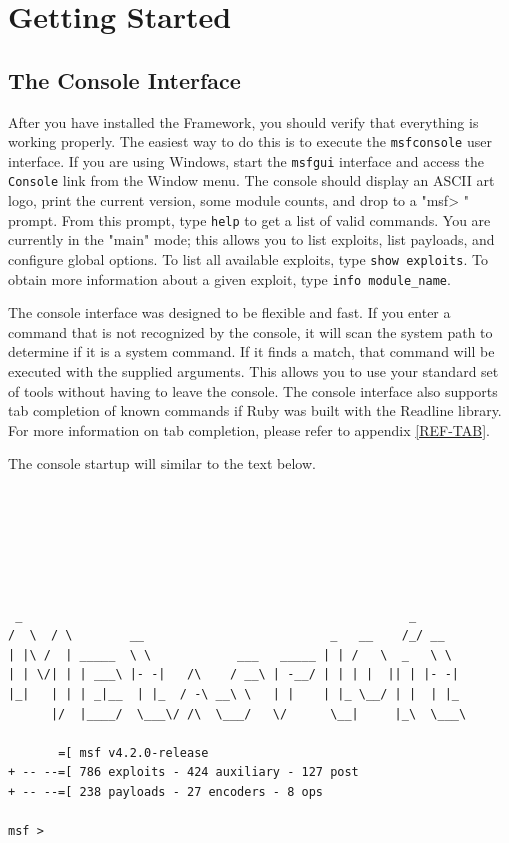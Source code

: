 \documentclass{report}
\begin{document}
\pagebreak

\chapter{Getting Started}

    \section{The Console Interface}
    \label{STARTED-CONSOLE}

\par
After you have installed the Framework, you should verify that everything is
working properly. The easiest way to do this is to execute the
\texttt{msfconsole} user interface. If you are using Windows, start the \texttt{msfgui}
interface and access the \texttt{Console} link from the Window menu.
The console should display an ASCII art logo, print the current version, some module
counts, and drop to a "msf> " prompt. From this prompt, type \texttt{help} to get a list of
valid commands. You are currently in the "main" mode; this allows you to list
exploits, list payloads, and configure global options. To list all available
exploits, type \texttt{show exploits}. To obtain more information about a given
exploit, type \texttt{info module\_name}.

\par
The console interface was designed to be flexible and fast. If you
enter a command that is not recognized by the console, it will scan the system
path to determine if it is a system command. If it finds a match, that command will be
executed with the supplied arguments. This allows you to use your standard set of tools
without having to leave the console. The console interface also supports tab completion of
known commands if Ruby was built with the Readline library. For more information on tab
completion, please refer to appendix \ref{REF-TAB}.

\par
The console startup will similar to the text below.

\begin{verbatim}






 _                                                      _
/  \  / \        __                          _   __    /_/ __
| |\ /  | _____  \ \            ___   _____ | | /   \  _   \ \
| | \/| | | ___\ |- -|   /\    / __\ | -__/ | | | |  || | |- -|
|_|   | | | _|__  | |_  / -\ __\ \   | |    | |_ \__/ | |  | |_
      |/  |____/  \___\/ /\  \___/   \/      \__|     |_\  \___\

       =[ msf v4.2.0-release
+ -- --=[ 786 exploits - 424 auxiliary - 127 post
+ -- --=[ 238 payloads - 27 encoders - 8 ops

msf >
\end{verbatim}
\end{document}

